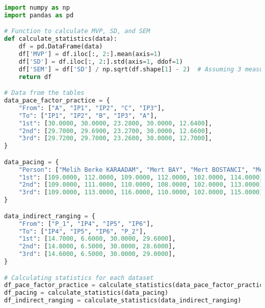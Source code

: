 \documentclass[12pt]{article}
\begin{document}
\begin{lstlisting}[language=Python]
import numpy as np
import pandas as pd

# Function to calculate MVP, SD, and SEM
def calculate_statistics(data):
    df = pd.DataFrame(data)
    df['MVP'] = df.iloc[:, 2:].mean(axis=1)
    df['SD'] = df.iloc[:, 2:].std(axis=1, ddof=1)
    df['SEM'] = df['SD'] / np.sqrt(df.shape[1] - 2)  # Assuming 3 measurements, adjust if necessary
    return df

# Data from the tables
data_pace_factor_practice = {
    "From": ["A", "IP1", "IP2", "C", "IP3"],
    "To": ["IP1", "IP2", "B", "IP3", "A"],
    "1st": [30.0000, 30.0000, 23.2800, 30.0000, 12.6400],
    "2nd": [29.7000, 29.6900, 23.2700, 30.0000, 12.6600],
    "3rd": [29.7200, 29.7000, 23.2600, 30.0000, 12.7000],
}

data_pacing = {
    "Person": ["Melih Berke KARAADAM", "Mert BAY", "Mert BOSTANCI", "Mevlut Yagiz KUL", "Muhammet YAGCIOGLU", "Muhammet Taylan ARSLAN"],
    "1st": [109.0000, 112.0000, 109.0000, 112.0000, 102.0000, 114.0000],
    "2nd": [109.0000, 111.0000, 110.0000, 108.0000, 102.0000, 113.0000],
    "3rd": [109.0000, 113.0000, 116.0000, 110.0000, 102.0000, 115.0000],
}

data_indirect_ranging = {
    "From": ["P_1", "IP4", "IP5", "IP6"],
    "To": ["IP4", "IP5", "IP6", "P_2"],
    "1st": [14.7000, 6.6000, 30.0000, 29.6000],
    "2nd": [14.8000, 6.5000, 30.0000, 28.6000],
    "3rd": [14.6000, 6.5000, 30.0000, 29.0000],
}

# Calculating statistics for each dataset
df_pace_factor_practice = calculate_statistics(data_pace_factor_practice)
df_pacing = calculate_statistics(data_pacing)
df_indirect_ranging = calculate_statistics(data_indirect_ranging)
\end{lstlisting}
\end{document}
